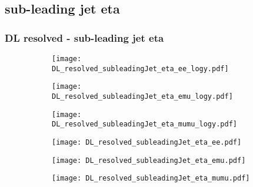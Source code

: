 \documentclass[aspectratio=169,8pt]{beamer}
\begin{document}
\subsection{sub-leading jet eta}
\begin{frame}
\frametitle{DL resolved - sub-leading jet eta}
\begin{figure}
\captionsetup[subfigure]{labelformat=empty}
\begin{subfigure}{0.32\textwidth}
\texttt{[image: DL\_resolved\_subleadingJet\_eta\_ee\_logy.pdf]}
\vspace*{-0.15cm}
\end{subfigure}
\hfil
\begin{subfigure}{0.32\textwidth}
\texttt{[image: DL\_resolved\_subleadingJet\_eta\_emu\_logy.pdf]}
\vspace*{-0.15cm}
\end{subfigure}
\hfil
\begin{subfigure}{0.32\textwidth}
\texttt{[image: DL\_resolved\_subleadingJet\_eta\_mumu\_logy.pdf]}
\vspace*{-0.15cm}
\end{subfigure}
\hfil
\begin{subfigure}{0.32\textwidth}
\texttt{[image: DL\_resolved\_subleadingJet\_eta\_ee.pdf]}
\vspace*{-0.15cm}
\end{subfigure}
\hfil
\begin{subfigure}{0.32\textwidth}
\texttt{[image: DL\_resolved\_subleadingJet\_eta\_emu.pdf]}
\vspace*{-0.15cm}
\end{subfigure}
\hfil
\begin{subfigure}{0.32\textwidth}
\texttt{[image: DL\_resolved\_subleadingJet\_eta\_mumu.pdf]}
\vspace*{-0.15cm}
\end{subfigure}
\hfil
\end{figure}
\end{frame}
\newpage
\end{document}
